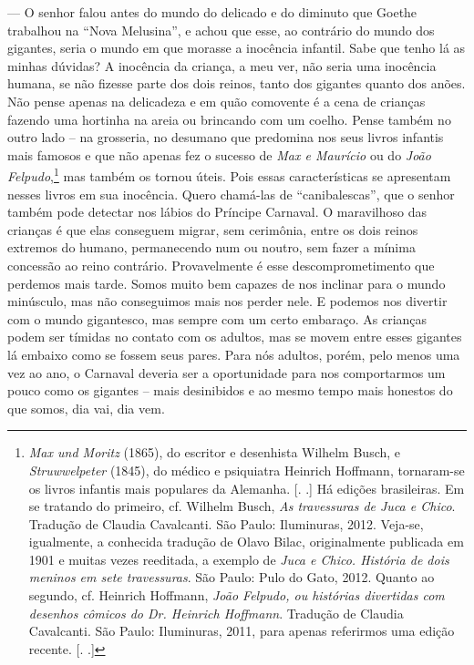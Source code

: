 --- O senhor falou antes do mundo do delicado e do diminuto que Goethe
trabalhou na ``Nova Melusina'', e achou que esse, ao contrário do mundo
dos gigantes, seria o mundo em que morasse a inocência infantil. Sabe
que tenho lá as minhas dúvidas? A inocência da criança, a meu ver, não
seria uma inocência humana, se não fizesse parte dos dois reinos, tanto
dos gigantes quanto dos anões. Não pense apenas na delicadeza e em quão
comovente é a cena de crianças fazendo uma hortinha na areia ou
brincando com um coelho. Pense também no outro lado -- na grosseria, no
desumano que predomina nos seus livros infantis mais famosos e que não
apenas fez o sucesso de \emph{Max e Maurício} ou do \emph{João
Felpudo},\footnote{\emph{Max und Moritz} (1865), do escritor e
  desenhista Wilhelm Busch, e \emph{Struwwelpeter} (1845), do médico e
  psiquiatra Heinrich Hoffmann, tornaram-se os livros infantis mais
  populares da Alemanha. [. .] Há edições brasileiras. Em se
  tratando do primeiro, cf. Wilhelm Busch, \emph{As travessuras de Juca
  e Chico}. Tradução de Claudia Cavalcanti. São Paulo: Iluminuras, 2012.
  Veja-se, igualmente, a conhecida tradução de Olavo Bilac,
  originalmente publicada em 1901 e muitas vezes reeditada, a exemplo de
  \emph{Juca e Chico. História de dois meninos em sete travessuras}. São
  Paulo: Pulo do Gato, 2012. Quanto ao segundo, cf. Heinrich Hoffmann,
  \emph{João Felpudo, ou histórias divertidas com desenhos cômicos do
  Dr. Heinrich Hoffmann}. Tradução de Claudia Cavalcanti. São Paulo:
  Iluminuras, 2011, para apenas referirmos uma edição recente. [.
  .]} mas também os tornou úteis. Pois essas características se
apresentam nesses livros em sua inocência. Quero chamá-las de
``canibalescas'', que o senhor também pode detectar nos lábios do
Príncipe Carnaval. O maravilhoso das crianças é que elas conseguem
migrar, sem cerimônia, entre os dois reinos extremos do humano,
permanecendo num ou noutro, sem fazer a mínima concessão ao reino
contrário. Provavelmente é esse descomprometimento que perdemos mais
tarde. Somos muito bem capazes de nos inclinar para o mundo minúsculo,
mas não conseguimos mais nos perder nele. E podemos nos divertir com o
mundo gigantesco, mas sempre com um certo embaraço. As crianças podem
ser tímidas no contato com os adultos, mas se movem entre esses gigantes
lá embaixo como se fossem seus pares. Para nós adultos, porém, pelo
menos uma vez ao ano, o Carnaval deveria ser a oportunidade para nos
comportarmos um pouco como os gigantes -- mais desinibidos e ao mesmo
tempo mais honestos do que somos, dia vai, dia vem.

